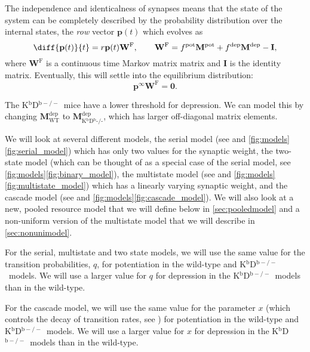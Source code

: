 \documentclass[10pt]{article}
\newcommand{\I}{\mathbf{I}}
\newcommand{\pr}{\mathbf{p}}
\newcommand{\eq}{\pr^\infty}
\newcommand{\w}{\mathbf{w}}
\newcommand{\W}{\mathbf{W}}
\newcommand{\frg}{\W^\mathrm{F}}
\newcommand{\M}{\mathbf{M}}
\newcommand{\pot}{^{\text{pot}}}
\newcommand{\dep}{^{\text{dep}}}
\newcommand{\wt}{_{\text{WT}}}
\newcommand{\ko}{_{\text{K$^\mathrm{b}$D$^\mathrm{b}$-/-}}}
\newcommand{\KO}{K$^\mathrm{b}$D$^{\mathrm{b}-/-}$}
\begin{document}
The independence and identicalness of synapses means that the state of the system can be completely described by the probability distribution over the internal states, the \emph{row} vector $\pr(t)$ which evolves as
%
\begin{equation}\label{eq:evolve}
  \diff{\pr(t)}{t} = r\pr(t)\frg,
  \qquad
  \frg = f\pot\M\pot+f\dep\M\dep-\I,
\end{equation}
%
where $\frg$ is a continuous time Markov matrix matrix and $\I$ is the identity matrix.
Eventually, this will settle into the equilibrium distribution:
%
\begin{equation}\label{eq:eqprob}
  \eq\frg = \mathbf{0}.
\end{equation}
%



The \KO\ mice have a lower threshold for depression.
We can model this by changing $\M\dep\wt$ to $\M\dep\ko$, which has larger off-diagonal matrix elements.

We will look at several different models,
the serial model (see \cite{Leibold2008serial,Ben-DayanRubin2007sparse} and \autoref{fig:models}\ref{fig:serial_model}) which has only two values for the synaptic weight,
the two-state model (which can be thought of as a special case of the serial model, see \autoref{fig:models}\ref{fig:binary_model}),
the multistate model (see \cite{amit1994learning,Fusi2007multistate} and \autoref{fig:models}\ref{fig:multistate_model}) which has a linearly varying synaptic weight,
and the cascade model (see \cite{Fusi2005cascade} and \autoref{fig:models}\ref{fig:cascade_model}).
We will also look at a new, pooled resource model that we will define below in \autoref{sec:pooledmodel} and a non-uniform version of the multistate model that we will describe in \autoref{sec:nonunimodel}.

For the serial, multistate and two state models, we will use the same value for the transition probabilities, $q$, for potentiation in the wild-type and \KO\ models.
We will use a larger value for $q$ for depression in the \KO\ models than in the wild-type.

For the cascade model, we will use the same value for the parameter $x$ (which controls the decay of transition rates, see \cite{Fusi2005cascade}) for potentiation in the wild-type and \KO\ models.
We will use a larger value for $x$ for depression in the \KO\ models than in the wild-type.
\end{document}
